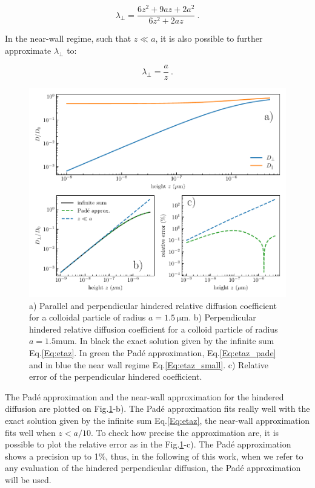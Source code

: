 \begin{equation}
	\lambda_\bot =  \frac{6z^2 + 9az + 2a^2}{6z^2 + 2az}~.
	\label{Eq:etaz_pade}
\end{equation}

In the near-wall regime, such that $z \ll a$, it is also possible to further approximate $\lambda_\bot$ to:

\begin{equation}
	\lambda_\bot = \frac{a}{z} ~.
	\label{Eq:etaz_small}
\end{equation}


\begin{figure}[H]
	\centering
	\includegraphics{02_body/chapter3/images/theory_lambda/hindered_diffusion.pdf}
	\caption{a)  Parallel and perpendicular hindered relative diffusion coefficient for a colloidal particle of radius $a = 1.5 ~ \mathrm{\mu m}$. b) Perpendicular hindered relative diffusion coefficient for a colloid particle of radius $a = 1.5 \mathrm{mu m}$. In black the exact solution given by the infinite sum Eq.\ref{Eq:etaz}. In green the Padé approximation, Eq.\ref{Eq:etaz_pade} and in blue the near wall regime Eq.\ref{Eq:etaz_small}. c) Relative error of the perpendicular hindered coefficient.}
	\label{fig.etaz}
\end{figure}


The Padé approximation and the near-wall approximation for the hindered diffusion are plotted on Fig.\ref{fig.etaz}-b). The Padé approximation fits really well with the exact solution given by the infinite sum Eq.\ref{Eq:etaz}, the near-wall approximation fits well when $z < a / 10$. To check how precise the approximation are, it is possible to plot the relative error as in the Fig.\ref{fig.etaz}-c). The Padé approximation shows a precision up to 1\%, thus, in the following of this work, when we refer to any evaluation of the hindered perpendicular diffusion, the Padé approximation will be used. 


